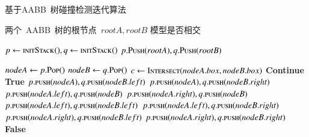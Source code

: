 \begin{algorithm}[!ht]
\small
\caption{基于AABB~树碰撞检测迭代算法}
\label{alg:aabbtree:traverse:iterator}
\begin{algorithmic}[1]
\Require
两个~AABB~树的根节点~$rootA, rootB$
\Ensure
模型是否相交

  \State $p \gets \Call{initStack()}{}, q \gets \Call{initStack()}{}$  
  \State $p.\Call{Push}{rootA}, q.\Call{Push}{rootB}$  
  
      \State $nodeA \gets p.\Call{Pop()}{}$
      \State $nodeB \gets q.\Call{Pop()}{}$
      \State $c \gets \Call{Intersect}{nodeA.box, nodeB.box}$ 
          \State \textbf{Continue} 
      \EndIf
                          \State {}
                          \State \Return \textbf{True} 
                      \EndIf
                  \EndFor
              \EndFor
          \Else  {}
              \State $p.\Call{push}{nodeA}, q.\Call{push}{nodeB.left}$
              \State $p.\Call{push}{nodeA}, q.\Call{push}{nodeB.right}$
          \EndIf
      \Else {}
              \State $p.\Call{push}{nodeA.left}, q.\Call{push}{nodeB}$
              \State $p.\Call{push}{nodeA.right}, q.\Call{push}{nodeB}$
          \Else
              \State $p.\Call{push}{nodeA.left}, q.\Call{push}{nodeB.left}$
              \State $p.\Call{push}{nodeA.left}, q.\Call{push}{nodeB.right}$
              \State $p.\Call{push}{nodeA.right}, q.\Call{push}{nodeB.left}$
              \State $p.\Call{push}{nodeA.right}, q.\Call{push}{nodeB.right}$
          \EndIf
      \EndIf
  \EndWhile
  \State \Return \textbf{False} 
\EndFunction
\end{algorithmic}
\end{algorithm}

